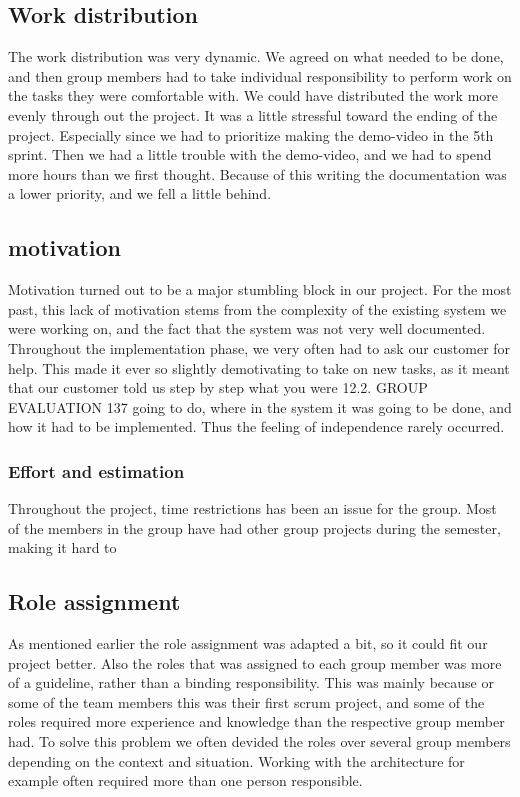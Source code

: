\subsection{Work distribution}

The work distribution was very dynamic. We agreed on what needed to be done, and then group members had to take individual responsibility to perform work on the tasks they were comfortable with.
We could have distributed the work more evenly through out the project. 
It was a little stressful toward the ending of the project. Especially since we had to prioritize making the demo-video in the 5th sprint. Then we had a little trouble with the demo-video, and we had to spend more hours than we first thought. Because of this writing the documentation was a lower priority, and we fell a little behind.  
  
\subsection{motivation}
Motivation turned out to be a major stumbling block in our project. For the
most past, this lack of motivation stems from the complexity of the existing
system we were working on, and the fact that the system was not very well
documented. Throughout the implementation phase, we very often had to ask
our customer for help. This made it ever so slightly demotivating to take on
new tasks, as it meant that our customer told us step by step what you were
12.2. GROUP EVALUATION 137
going to do, where in the system it was going to be done, and how it had to be
implemented. Thus the feeling of independence rarely occurred.
\subsubsection{Effort and estimation}
Throughout the project, time restrictions has been an issue for the group. Most of the 
members in the group have had other group projects during the semester, making it hard to 


\subsection{Role assignment}
As mentioned earlier the role assignment was adapted a bit, so it could fit our project better. Also the roles that was assigned to each group member was more of a guideline, rather than a binding responsibility. This was mainly because or some of the team members this was their first scrum project, and some of the roles required more experience and knowledge than the respective group member had. To solve this problem we often devided the roles over several group members depending on the context and situation. Working with the architecture for example often required more than one person responsible. 

